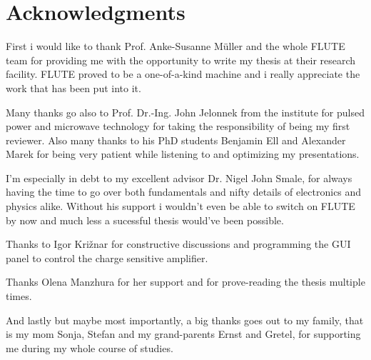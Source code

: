 \chapter*{Acknowledgments}

First i would like to thank Prof. Anke-Susanne Müller and the whole FLUTE team for providing me with the opportunity to write my thesis at their research facility. FLUTE proved to be a one-of-a-kind machine and i really appreciate the work that has been put into it.

Many thanks go also to Prof. Dr.-Ing. John Jelonnek from the institute for pulsed power and microwave technology for taking the responsibility of being my first reviewer. Also many thanks to his PhD students Benjamin Ell and Alexander Marek for being very patient while listening to and optimizing my presentations. 

I'm especially in debt to my excellent advisor Dr. Nigel John Smale, for always having the time to go over both fundamentals and nifty details of electronics and physics alike. Without his support i wouldn't even be able to switch on FLUTE by now and much less a sucessful thesis would've been possible.

Thanks to Igor Križnar for constructive discussions and programming the GUI panel to control the charge sensitive amplifier.

Thanks Olena Manzhura for her support and for prove-reading the thesis multiple times.

And lastly but maybe most importantly, a big thanks goes out to my family, that is my mom Sonja, Stefan and my grand-parents Ernst and Gretel, for supporting me during my whole course of studies.
